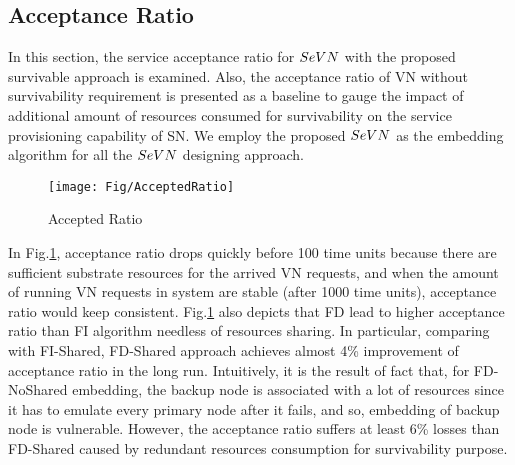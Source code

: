 


\subsection{Acceptance Ratio}
In this section, the service acceptance ratio for $SeVN$ with the proposed survivable approach is examined. Also, the acceptance ratio of VN without survivability requirement is presented as a baseline to gauge the impact of additional amount of resources consumed for survivability on the service provisioning capability of SN. We employ the proposed $SeVN$ as the embedding algorithm for all the $SeVN$ designing approach.
\begin{figure}
  \centering
  \texttt{[image: Fig/AcceptedRatio]}\\
  \caption{Accepted Ratio}\label{fig:AcceptedRatio}
\end{figure}

In Fig.\ref{fig:AcceptedRatio}, acceptance ratio drops quickly before 100 time units because there are sufficient substrate resources for the arrived VN requests, and when the amount of running VN requests in system are stable (after 1000 time units), acceptance
ratio would keep consistent. Fig.\ref{fig:AcceptedRatio} also depicts that FD lead to higher acceptance ratio
than FI algorithm needless of resources sharing. In particular, comparing with FI-Shared, FD-Shared approach achieves almost 4\% improvement of acceptance ratio in the long run. Intuitively, it is the result of fact that, for FD-NoShared embedding,
the backup node is associated with a lot of resources since it has to emulate every primary node after it fails, and
so, embedding of backup node is vulnerable. However, the acceptance ratio suffers at least 6\% losses than FD-Shared caused by redundant resources consumption for survivability purpose.

